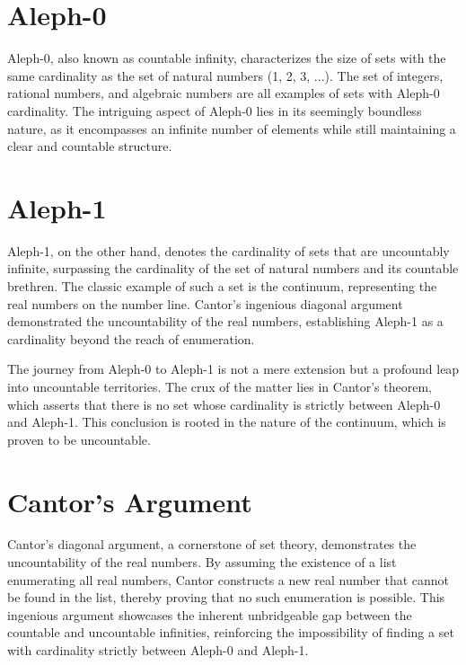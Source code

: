 \documentclass[12pt]{article}
\begin{document}
\section{Aleph-0}

Aleph-0, also known as countable infinity, characterizes the size of sets with the same cardinality as the set of natural numbers (1, 2, 3, ...). The set of integers, rational numbers, and algebraic numbers are all examples of sets with Aleph-0 cardinality. The intriguing aspect of Aleph-0 lies in its seemingly boundless nature, as it encompasses an infinite number of elements while still maintaining a clear and countable structure.
\pagebreak


\section{Aleph-1}

Aleph-1, on the other hand, denotes the cardinality of sets that are uncountably infinite, surpassing the cardinality of the set of natural numbers and its countable brethren. The classic example of such a set is the continuum, representing the real numbers on the number line. Cantor's ingenious diagonal argument demonstrated the uncountability of the real numbers, establishing Aleph-1 as a cardinality beyond the reach of enumeration.

The journey from Aleph-0 to Aleph-1 is not a mere extension but a profound leap into uncountable territories. The crux of the matter lies in Cantor's theorem, which asserts that there is no set whose cardinality is strictly between Aleph-0 and Aleph-1. This conclusion is rooted in the nature of the continuum, which is proven to be uncountable.
\pagebreak
\section{Cantor's Argument}

Cantor's diagonal argument, a cornerstone of set theory, demonstrates the uncountability of the real numbers. By assuming the existence of a list enumerating all real numbers, Cantor constructs a new real number that cannot be found in the list, thereby proving that no such enumeration is possible. This ingenious argument showcases the inherent unbridgeable gap between the countable and uncountable infinities, reinforcing the impossibility of finding a set with cardinality strictly between Aleph-0 and Aleph-1.
\end{document}
